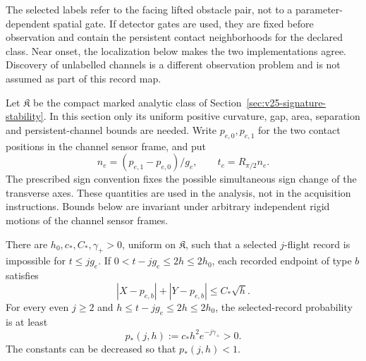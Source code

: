 The selected labels refer to the facing lifted obstacle pair, not to a
parameter-dependent spatial gate.  If detector gates are used, they are
fixed before observation and contain the persistent contact neighborhoods
for the declared class.  Near onset, the localization below makes the two
implementations agree.  Discovery of unlabelled channels is a different
observation problem and is not assumed as part of this record map.

Let \(\mathfrak K\) be the compact marked analytic class of
Section~\ref{sec:v25-signature-stability}.  In this section only its uniform
positive curvature, gap, area, separation and persistent-channel bounds are
needed.  Write \(p_{e,0},p_{e,1}\) for the two contact positions in the
channel sensor frame, and put
\[
 n_e=(p_{e,1}-p_{e,0})/g_e,\qquad t_e=R_{\pi/2}n_e.
\]
The prescribed sign convention fixes the possible simultaneous sign change
of the transverse axes.  These quantities are used in the analysis, not in
the acquisition instructions.  Bounds below are invariant under arbitrary
independent rigid motions of the channel sensor frames.

\begin{lemma}
\label{lem:v25-physical-localization}
There are \(h_0,c_*,C_*,\gamma_+>0\), uniform on \(\mathfrak K\), such
that a selected \(j\)-flight record is impossible for \(t\le jg_e\).
If \(0<t-jg_e\le2h\le2h_0\), each recorded endpoint of type \(b\)
satisfies
\begin{equation}\label{eq:v25-endpoint-localization}
                 |X-p_{e,b}|+|Y-p_{e,b}|\le C_*\sqrt h.
\end{equation}
For every even \(j\ge2\) and \(h\le t-jg_e\le2h\le2h_0\), the
selected-record probability is at least
\begin{equation}\label{eq:v25-pilot-mass}
                   p_*(j,h):=c_*h^2e^{-j\gamma_+}>0.
\end{equation}
The constants can be decreased so that \(p_*(j,h)<1\).
\end{lemma}

